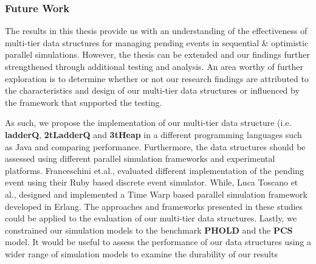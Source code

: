 \subsubsection{Future Work}

The results in this thesis provide us with an understanding of the effectiveness of multi-tier data structures for managing pending events in sequential \& optimistic parallel simulations. However, the thesis can be extended and our findings further strengthened through additional testing and analysis. An area worthy of further exploration is to determine whether or not our research findings are attributed to the characteristics and design of our multi-tier data structures or influenced by the framework that supported the testing. 

As such, we propose the implementation of our multi-tier data structure (i.e. \textbf{ladderQ}, \textbf{2tLadderQ} and \textbf{3tHeap} in a different programming languages such as Java and comparing performance. Furthermore, the data structures should be assessed using different parallel simulation frameworks and experimental platforms. Franceschini et.al., evaluated different implementation of the pending event using their Ruby based discrete event simulator\cite{franceschini-15}. While, Luca Toscano et al., designed and implemented a Time Warp based parallel simulation framework developed in Erlang\cite{toscano2012parallel}. The approaches and frameworks presented in these studies could be applied to the evaluation of our multi-tier data structures. Lastly, we constrained our simulation models to the benchmark \textbf{PHOLD} and the 
\textbf{PCS} model. It would be useful to assess the performance of our data structures using a wider range of simulation models to examine the durability of our results

       






